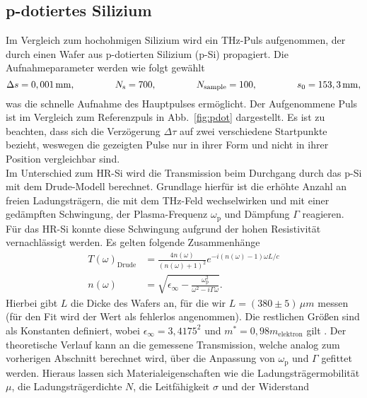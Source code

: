 \subsection{\label{sec:A23}p-dotiertes Silizium}
Im Vergleich zum hochohmigen Silizium wird ein THz-Puls aufgenommen, der durch einen Wafer aus 
p-dotierten Silizium (p-Si) propagiert. Die Aufnahmeparameter werden wie folgt gewählt
\begin{equation}
    \Delta s = 0,001\,\si{mm}, \hspace{1.5cm} N_{\text{s}} = 700, \hspace{1.5cm} N_{\text{sample}} = 100, \hspace{1.5cm} s_{0} = 153,3\,\si{mm},
\end{equation} 
was die schnelle Aufnahme des Hauptpulses ermöglicht. Der Aufgenommene Puls ist im Vergleich zum Referenzpuls in 
Abb.~\ref{fig:pdot} dargestellt. Es ist zu beachten, dass sich die Verzögerung $\Delta\tau$ auf zwei verschiedene 
Startpunkte bezieht, weswegen die gezeigten Pulse nur in ihrer Form und nicht in ihrer Position vergleichbar sind. \\ 
Im Unterschied zum HR-Si wird die Transmission beim Durchgang durch das p-Si mit dem Drude-Modell berechnet.
Grundlage hierfür ist die erhöhte Anzahl an freien Ladungsträgern, die mit dem THz-Feld 
wechselwirken und mit einer gedämpften Schwingung, der Plasma-Frequenz $\omega_{\text{p}}$ und 
Dämpfung $\Gamma$ reagieren. Für das HR-Si konnte diese Schwingung aufgrund der hohen 
Resistivität vernachlässigt werden. Es gelten folgende Zusammenhänge
\begin{align}
    T(\omega)_{\text{Drude}} &= \frac{4n(\omega)}{(n(\omega)+1)^{2}}e^{-i(n(\omega)-1)\omega L/c} \\
    n(\omega) &= \sqrt{\epsilon_{\infty} - \frac{\omega_{\text{p}}^{2}}{\omega^{2}-i\Gamma\omega}}.
\end{align}
Hierbei gibt $L$ die Dicke des 
Wafers an, für die wir $L = (380\pm5)\,\si{\mu m}$ messen 
(für den Fit wird der Wert als fehlerlos angenommen).
Die restlichen Größen sind als Konstanten definiert, 
wobei $\epsilon_{\infty}=3,4175^{2}$ und $m^{*} = 0,98m_{\text{elektron}}$
gilt \cite{Anleitung}.
Der theoretische Verlauf kann an die gemessene Transmission, 
welche analog zum vorherigen Abschnitt berechnet wird, 
über die Anpassung von $\omega_{\text{p}}$ und $\Gamma$ gefittet werden.
Hieraus lassen sich Materialeigenschaften wie die Ladungsträgermobilität $\mu$, 
die Ladungsträgerdichte $N$, die Leitfähigkeit $\sigma$ und der Widerstand 
